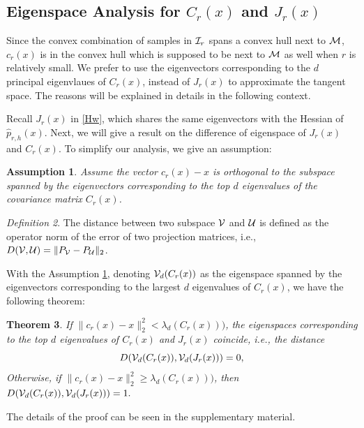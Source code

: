 \documentclass[aos,preprint]{imsart}
\newtheorem{theorem}{Theorem}[section]
\newtheorem{assumption}[theorem]{Assumption}
\theoremstyle{remark}
\newtheorem{definition}[theorem]{Definition}
\begin{document}
\subsection{Eigenspace Analysis for $C_r(x)$ and $J_r(x)$}


Since the convex combination of samples in ${\cal I}_r$ spans a convex hull next to $\cal M$,  $c_r(x)$ is in the convex hull which is supposed to be next to $\cal M$ as well when $r$ is relatively small.
We prefer to use the eigenvectors corresponding to the $d$ principal eigenvlaues of $C_r(x)$, instead of $J_r(x)$ to approximate the tangent space. The reasons will be explained in details in the following context.


Recall  $J_r(x)$ in \eqref{Hw}, which shares the same eigenvectors with the Hessian of $\hat{p}_{r,h}(x)$. Next, we will give a result on the difference of eigenspace of $J_r(x)$ and $C_r(x)$. To simplify our analysis, we give an assumption:
\begin{assumption}\label{assumption}
Assume the vector $c_r(x)-x$ is orthogonal to the subspace spanned by the eigenvectors corresponding to the top $d$ eigenvalues of the covariance matrix $C_r(x)$. %
\end{assumption}
\begin{definition}
The distance between two subspace ${\cal V}$ and ${\cal U} $ is defined as the operator norm of the error of two projection matrices, i.e., $D({\cal V},{\cal U}) = \|P_{\cal V}-P_{\cal U}\|_2$.
\end{definition}

With the Assumption \ref{assumption}, denoting ${\cal V}_d (C_r(x))$ as the eigenspace spanned by the eigenvectors corresponding to the largest $d$ eigenvalues of $C_r(x)$, we have the following theorem:
\begin{theorem}
If $\|c_r(x)-x\|_2^2< \lambda_d(C_r(x)))$, the eigenspaces corresponding to the top $d$ eigenvalues of $C_r(x)$ and $J_r(x)$ coincide, i.e., the distance 
\[
D({\cal V}_d (C_r(x)), {\cal V}_d (J_r(x)))=0,
\]
Otherwise, if $\|c_r(x)-x\|_2^2\geq \lambda_d(C_r(x)))$, then 
$
D({\cal V}_d (C_r(x)),{\cal V}_d (J_r(x)))=1.
$
\end{theorem}
The details of the proof can be seen in the supplementary material.
\end{document}
